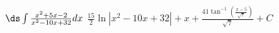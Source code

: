 {$\ds \int \frac{x^2+5 x-2}{x^2-10 x+32} dx $}
{$\frac{15}{2} \ln \left|x^2-10 x+32\right|+x+\frac{41 \tan ^{-1}\left(\frac{x-5}{\sqrt{7}}\right)}{\sqrt{7}}+C$}